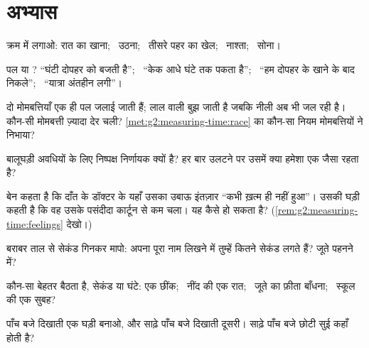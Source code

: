\section{अभ्यास}

\begin{exercise}[$\star$]\label{exo:g2:measuring-time:1}
क्रम में लगाओ: रात का खाना; \ उठना; \ तीसरे पहर का खेल; \ नाश्ता;
\ सोना।
\end{exercise}

\begin{exercise}[$\star$]\label{exo:g2:measuring-time:2}
पल या ? ``घंटी दोपहर को बजती है''; \ ``केक आधे घंटे तक पकता
है''; \ ``हम दोपहर के खाने के बाद निकले''; \ ``यात्रा अंतहीन लगी''।
\end{exercise}

\begin{exercise}[$\star$]\label{exo:g2:measuring-time:3}
दो मोमबत्तियाँ एक ही पल जलाई जाती हैं; लाल वाली बुझ जाती है जबकि नीली
अब भी जल रही है। कौन-सी मोमबत्ती ज़्यादा देर चली?
\cref{met:g2:measuring-time:race} का कौन-सा नियम मोमबत्तियों ने
निभाया?
\end{exercise}

\begin{exercise}[$\star$]\label{exo:g2:measuring-time:4}
बालूघड़ी अवधियों के लिए निष्पक्ष निर्णायक क्यों है? हर बार उलटने पर
उसमें क्या हमेशा एक जैसा रहता है?
\end{exercise}

\begin{exercise}[$\star$]\label{exo:g2:measuring-time:5}
बेन कहता है कि दाँत के डॉक्टर के यहाँ उसका उबाऊ इंतज़ार ``कभी ख़त्म
ही नहीं हुआ''। उसकी घड़ी कहती है कि वह उसके पसंदीदा कार्टून से कम
चला। यह कैसे हो सकता है? (\cref{rem:g2:measuring-time:feelings}
देखो।)
\end{exercise}

\begin{exercise}[$\star$]\label{exo:g2:measuring-time:6}
बराबर ताल से सेकंड गिनकर मापो: अपना पूरा नाम लिखने में तुम्हें कितने
सेकंड लगते हैं? जूते पहनने में?
\end{exercise}

\begin{exercise}[$\star$]\label{exo:g2:measuring-time:7}
कौन-सा  बेहतर बैठता है, सेकंड या घंटे: एक छींक; \ नींद की एक
रात; \ जूते का फ़ीता बाँधना; \ स्कूल की एक सुबह?
\end{exercise}

\begin{exercise}[$\star$]\label{exo:g2:measuring-time:8}
पाँच बजे दिखाती एक घड़ी बनाओ, और साढ़े पाँच बजे दिखाती दूसरी। साढ़े
पाँच बजे छोटी सुई कहाँ होती है?
\end{exercise}

